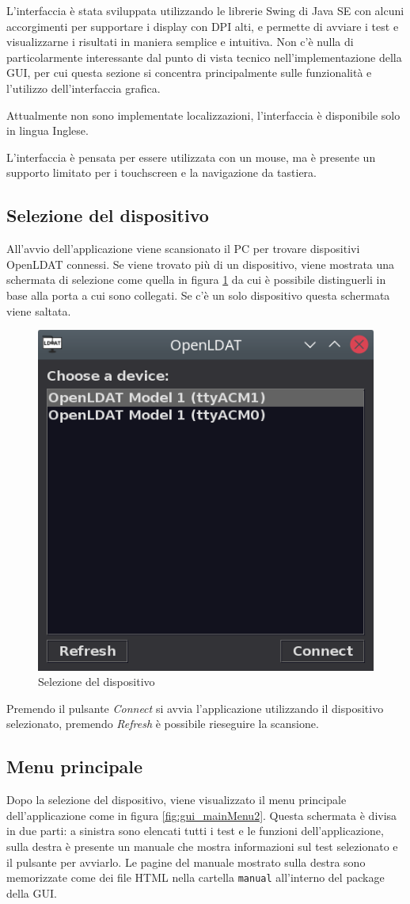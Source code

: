 L'interfaccia è stata sviluppata utilizzando le librerie Swing di Java SE con alcuni accorgimenti per supportare i display con DPI alti, e permette di avviare i test e visualizzarne i risultati in maniera semplice e intuitiva. Non c'è nulla di particolarmente interessante dal punto di vista tecnico nell'implementazione della GUI, per cui questa sezione si concentra principalmente sulle funzionalità e l'utilizzo dell'interfaccia grafica.

Attualmente non sono implementate localizzazioni, l'interfaccia è disponibile solo in lingua Inglese.

L'interfaccia è pensata per essere utilizzata con un mouse, ma è presente un supporto limitato per i touchscreen e la navigazione da tastiera.

\subsection{Selezione del dispositivo}
All'avvio dell'applicazione viene scansionato il PC per trovare dispositivi OpenLDAT connessi. Se viene trovato più di un dispositivo, viene mostrata una schermata di selezione come quella in figura \ref{fig:gui_deviceSelector} da cui è possibile distinguerli in base alla porta a cui sono collegati. Se c'è un solo dispositivo questa schermata viene saltata.

\begin{figure}[h]
	\centering
	\includegraphics[width=.5\textwidth]{Applicazione_files/gui_deviceSelector.png}
	\caption{Selezione del dispositivo}
	\label{fig:gui_deviceSelector}
\end{figure}

Premendo il pulsante \textit{Connect} si avvia l'applicazione utilizzando il dispositivo selezionato, premendo \textit{Refresh} è possibile rieseguire la scansione.

\subsection{Menu principale}
Dopo la selezione del dispositivo, viene visualizzato il menu principale dell'applicazione come in figura \ref{fig:gui_mainMenu2}. Questa schermata è divisa in due parti: a sinistra sono elencati tutti i test e le funzioni dell'applicazione, sulla destra è presente un manuale che mostra informazioni sul test selezionato e il pulsante per avviarlo. Le pagine del manuale mostrato sulla destra sono memorizzate come dei file HTML nella cartella \texttt{manual} all'interno del package della GUI.

